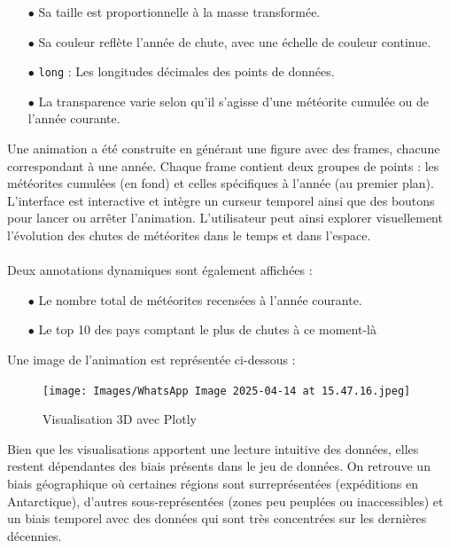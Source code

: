 \documentclass[12pt]{article}
\begin{document}
\begin{itemize}
    \item[$\bullet$] Sa taille est proportionnelle à la masse transformée.
    \item[$\bullet$] Sa couleur reflète l’année de chute, avec une échelle de couleur continue.
    \item[$\bullet$] \texttt{long} : Les longitudes décimales des points de données.
    \item[$\bullet$] La transparence varie selon qu’il s’agisse d’une météorite cumulée ou de l’année courante.
\end{itemize}
\vspace{0.3cm}
Une animation a été construite en générant une figure avec des frames, chacune correspondant à une année. Chaque frame contient deux groupes de points : les météorites cumulées (en fond) et celles spécifiques à l’année (au premier plan). L’interface est interactive et intègre un curseur temporel ainsi que des boutons pour lancer ou arrêter l’animation. L’utilisateur peut ainsi explorer visuellement l’évolution des chutes de météorites dans le temps et dans l’espace.\\
\\
Deux annotations dynamiques sont également affichées :\\
\begin{itemize}
    \item[$\bullet$] Le nombre total de météorites recensées à l’année courante.
    \item[$\bullet$] Le top 10 des pays comptant le plus de chutes à ce moment-là
\end{itemize}
\vspace{0.3cm}
Une image de l'animation est représentée ci-dessous :\\
\begin{figure}[H]
    \centering
    \texttt{[image: Images/WhatsApp Image 2025-04-14 at 15.47.16.jpeg]}
    \caption{Visualisation 3D avec Plotly}
\end{figure}
\vspace{0.3cm}

Bien que les visualisations apportent une lecture intuitive des données, elles restent dépendantes des biais présents dans le jeu de données. On retrouve un biais géographique où certaines régions sont surreprésentées (expéditions en Antarctique), d'autres sous-représentées (zones peu peuplées ou inaccessibles) et un biais temporel avec des données qui sont très concentrées sur les dernières décennies.\\
\\
\end{document}
